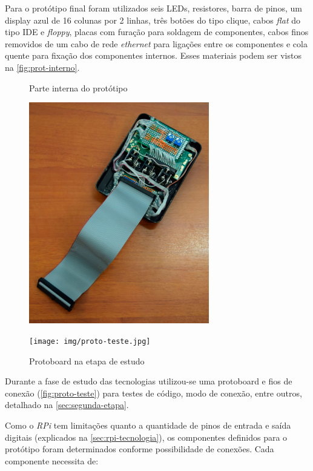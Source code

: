 \documentclass[
		12pt,				%
		openright,			%
		oneside,			%
		a4paper,			%
		chapter=TITLE,		%
		english,			%
		brazil				%
	]{abntex2}
\begin{document}
Para o protótipo final foram utilizados seis LEDs, resistores, barra de pinos, um display azul de 16 colunas por 2 linhas, três botões do tipo clique, cabos \textit{flat} do tipo IDE e \textit{floppy}, placas com furação para soldagem de componentes, cabos finos removidos de um cabo de rede \textit{ethernet} para ligações entre os componentes e cola quente para fixação dos componentes internos. Esses materiais podem ser vistos na \autoref{fig:prot-interno}.

\begin{figure}[htb]
	\label{teste}
	\centering
 	\begin{minipage}{0.43\textwidth}
		\centering
		\caption{\label{fig:prot-interno}Parte interna do protótipo}
		\includegraphics[width=0.7\textwidth]{img/prot-interno.jpg}
	\end{minipage}
	\hfill
	\begin{minipage}{0.55\textwidth}
		\centering
		\caption{\label{fig:proto-teste}Protoboard na etapa de estudo}
		\texttt{[image: img/proto-teste.jpg]}
	\end{minipage}
\end{figure}

Durante a fase de estudo das tecnologias utilizou-se uma protoboard e fios de conexão (\autoref{fig:proto-teste}) para testes de código, modo de conexão, entre outros, detalhado na \autoref{sec:segunda-etapa}.

Como o \textit{RPi} tem limitações quanto a quantidade de pinos de entrada e saída digitais (explicados na \autoref{sec:rpi-tecnologia}), os componentes definidos para o protótipo foram determinados conforme possibilidade de conexões. Cada componente necessita de:
\end{document}
